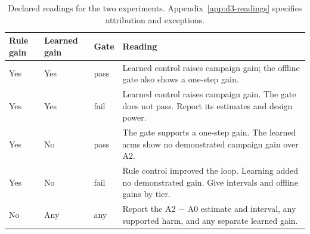 \begin{table}[t]
\caption{Declared readings for the two experiments. Appendix~\ref{app:d3-readings} specifies attribution and exceptions.}
\label{tab:readings}
\centering
\footnotesize
\setlength{\tabcolsep}{2.5pt}
\begin{tabular}{L{0.42in}L{0.47in}L{0.27in}L{1.8in}}
\toprule
Rule gain & Learned gain & Gate & Reading \\
\midrule
Yes & Yes & pass & Learned control raises campaign gain; the offline gate also shows a one-step gain. \\
Yes & Yes & fail & Learned control raises campaign gain. The gate does not pass. Report its estimates and design power. \\
Yes & No & pass & The gate supports a one-step gain. The learned arms show no demonstrated campaign gain over A2. \\
Yes & No & fail & Rule control improved the loop. Learning added no demonstrated gain. Give intervals and offline gains by tier. \\
No & Any & any & Report the A2 $-$ A0 estimate and interval, any supported harm, and any separate learned gain. \\
\bottomrule
\end{tabular}
\end{table}
